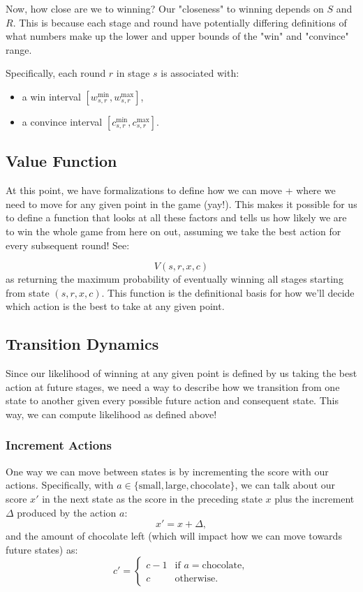 \documentclass{article}
\begin{document}
Now, how close are we to winning? Our "closeness" to winning depends on $S$ and $R$. This is because
each stage and round have potentially differing definitions of what numbers make up the lower and upper bounds of
the "win" and "convince" range. 

Specifically, each round $r$ in stage $s$ is associated with:
\begin{itemize}
    \item a win interval $[w_{s,r}^{\min}, w_{s,r}^{\max}]$,
    \item a convince interval $[c_{s,r}^{\min}, c_{s,r}^{\max}]$.
\end{itemize}

\subsection{Value Function}

At this point, we have formalizations to define how we can move + where we need to move
for any given point in the game (yay!). This makes it possible for us to define a function
that looks at all these factors and tells us how likely we are to win the whole game from here on out,
assuming we take the best action for every subsequent round! See:

\[
V(s,r,x,c)
\]
as returning the maximum probability of eventually winning all stages starting from state $(s,r,x,c)$. This function
is the definitional basis for how we'll decide which action is the best to take
at any given point. 

\subsection{Transition Dynamics}

Since our likelihood of winning at any given point is defined by us taking the best action at future stages,
we need a way to describe how we transition from one state to another given every possible future action
and consequent state. This way, we can compute likelihood as defined above!

\subsubsection{Increment Actions}

One way we can move between states is by incrementing the score with our actions. Specifically,
with $a \in \{\text{small}, \text{large}, \text{chocolate}\}$, we can talk about our score
$x'$ in the next state as the score in the preceding state $x$ plus the increment $\Delta$ produced by the action $a$:
\[
x' = x + \Delta,
\]
and the amount of chocolate left (which will impact how we can move towards future states) as:
\[
c' =
\begin{cases}
c - 1 & \text{if } a = \text{chocolate}, \\
c & \text{otherwise}.
\end{cases}
\]
\end{document}

